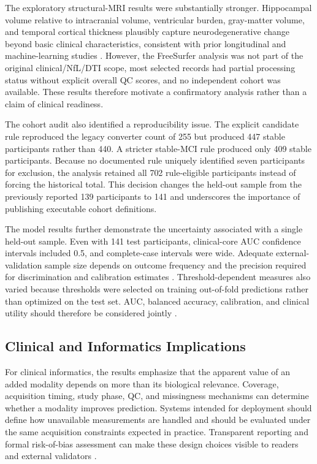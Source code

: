 \documentclass[preprint,12pt]{elsarticle}
\begin{document}
The exploratory structural-MRI results were substantially stronger. Hippocampal volume relative to intracranial volume, ventricular burden, gray-matter volume, and temporal cortical thickness plausibly capture neurodegenerative change beyond basic clinical characteristics, consistent with prior longitudinal and machine-learning studies \cite{jackPredictionADMRIBased1999,devanandHippocampalEntorhinalAtrophy2007,shannonl.risacherBaselineMRIPredictors2009,eskildsenPredictionAlzheimersDisease2013,moradiMachineLearningFramework2015}. However, the FreeSurfer analysis was not part of the original clinical/NfL/DTI scope, most selected records had partial processing status without explicit overall QC scores, and no independent cohort was available. These results therefore motivate a confirmatory analysis rather than a claim of clinical readiness.

The cohort audit also identified a reproducibility issue. The explicit candidate rule reproduced the legacy converter count of 255 but produced 447 stable participants rather than 440. A stricter stable-MCI rule produced only 409 stable participants. Because no documented rule uniquely identified seven participants for exclusion, the analysis retained all 702 rule-eligible participants instead of forcing the historical total. This decision changes the held-out sample from the previously reported 139 participants to 141 and underscores the importance of publishing executable cohort definitions.

The model results further demonstrate the uncertainty associated with a single held-out sample. Even with 141 test participants, clinical-core AUC confidence intervals included 0.5, and complete-case intervals were wide. Adequate external-validation sample size depends on outcome frequency and the precision required for discrimination and calibration estimates \cite{rileyMinimumSampleSizeExternal2021}. Threshold-dependent measures also varied because thresholds were selected on training out-of-fold predictions rather than optimized on the test set. AUC, balanced accuracy, calibration, and clinical utility should therefore be considered jointly \cite{steyerbergAssessingPerformancePrediction2010,vancalsterCalibrationAchillesHeel2019}.

\subsection{Clinical and Informatics Implications}

For clinical informatics, the results emphasize that the apparent value of an added modality depends on more than its biological relevance. Coverage, acquisition timing, study phase, QC, and missingness mechanisms can determine whether a modality improves prediction. Systems intended for deployment should define how unavailable measurements are handled and should be evaluated under the same acquisition constraints expected in practice. Transparent reporting and formal risk-of-bias assessment can make these design choices visible to readers and external validators \cite{collinsTransparentReportingMultivariable2015,wolffPROBASTToolAssess2019}.
\end{document}
